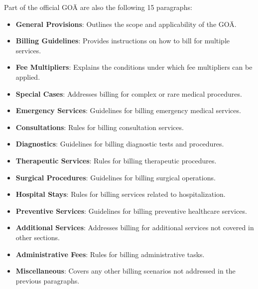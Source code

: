 Part of the official GOÄ are also the following 15 paragraphs\cite[]{hermanns2011gebuhrenordnung}:
\begin{itemize}
    \item \textbf{General Provisions}: Outlines the scope and applicability of the GOÄ.
    \item \textbf{Billing Guidelines}: Provides instructions on how to bill for multiple services.
    \item \textbf{Fee Multipliers}: Explains the conditions under which fee multipliers can be applied.
    \item \textbf{Special Cases}: Addresses billing for complex or rare medical procedures.
    \item \textbf{Emergency Services}: Guidelines for billing emergency medical services.
    \item \textbf{Consultations}: Rules for billing consultation services.
    \item \textbf{Diagnostics}: Guidelines for billing diagnostic tests and procedures.
    \item \textbf{Therapeutic Services}: Rules for billing therapeutic procedures.
    \item \textbf{Surgical Procedures}: Guidelines for billing surgical operations.
    \item \textbf{Hospital Stays}: Rules for billing services related to hospitalization.
    \item \textbf{Preventive Services}: Guidelines for billing preventive healthcare services.
    \item \textbf{Additional Services}: Addresses billing for additional services not covered in other sections.
    \item \textbf{Administrative Fees}: Rules for billing administrative tasks.
    \item \textbf{Miscellaneous}: Covers any other billing scenarios not addressed in the previous paragraphs.
\end{itemize}

